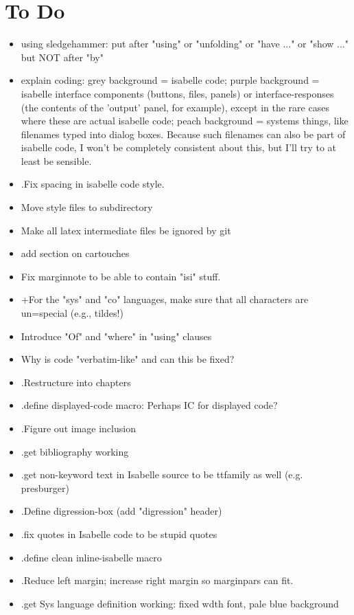 \chapter*{To Do}
\begin{itemize}
\item using sledgehammer: put after "using" or "unfolding" or "have ..." or "show ..." but NOT after "by"
\item explain coding: grey background = isabelle code; purple background = isabelle interface components (buttons, files, panels) or interface-responses (the contents of the 'output' panel, for example), except in the rare cases where these are actual isabelle code; peach background = systems things, like filenames typed into dialog boxes. Because such filenames can also be part of isabelle code, I won't be completely consistent about this, but I'll try to at least be sensible.
\item .Fix spacing in isabelle code style.
\item Move style files to subdirectory
\item Make all latex intermediate files be ignored by git
\item add section on cartouches
\item Fix marginnote to be able to contain "isi" stuff.
\item +For the "sys" and "co" languages, make sure that all characters are un=special (e.g., tildes!)
\item Introduce "Of" and "where" in "using" clauses
\item Why is code "verbatim-like" and can this be fixed? 
\item .Restructure into chapters
\item .define displayed-code macro: Perhaps IC for displayed code? 
\item .Figure out image inclusion
\item .get bibliography working
\item .get non-keyword text in Isabelle source to be ttfamily as well (e.g. presburger)
\item .Define digression-box (add "digression" header)
\item .fix quotes in Isabelle code to be stupid quotes
\item .define clean inline-isabelle macro 
\item .Reduce left margin; increase right margin so marginpars can fit.
\item .get Sys language definition working: fixed wdth font, pale blue background
\end{itemize}

